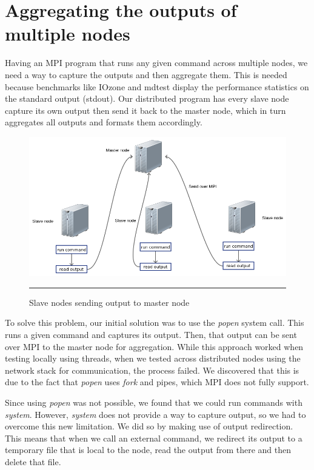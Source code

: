 
\section{Aggregating the outputs of multiple nodes}

Having an MPI program that runs any given command across multiple nodes, we need a way to capture the outputs and then aggregate them. This is needed because benchmarks like IOzone and mdtest display the performance statistics on the standard output (stdout). Our distributed program has every slave node capture its own output then send it back to the master node, which in turn aggregates all outputs and formats them accordingly.

\begin{figure}[H]
  \centering
    \includegraphics[scale=0.5]{Figures/slave_send_output.png}
    \rule{25em}{0.5pt}
  \caption[Slave nodes sending output]{Slave nodes sending output to master node}
  \label{fig:slave_send_output}
\end{figure}


To solve this problem, our initial solution was to use the \textit{popen}\cite{popen} system call. This runs a given command and captures its output. Then, that output can be sent over MPI to the master node for aggregation. While this approach worked when testing locally using threads, when we tested across distributed nodes using the network stack for communication, the process failed. We discovered that this is due to the fact that \textit{popen} uses \textit{fork} and pipes, which MPI does not fully support.

Since using \textit{popen} was not possible, we found that we could run commands with \textit{system}\cite{system}. However, \textit{system} does not provide a way to capture output, so we had to overcome this new limitation. We did so by making use of output redirection. This means that when we call an external command, we redirect its output to a temporary file that is local to the node, read the output from there and then delete that file.

